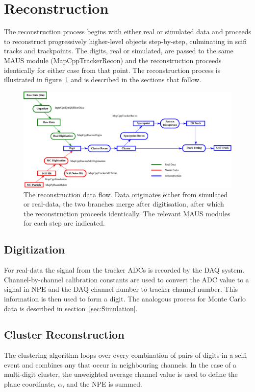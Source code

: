 \section{Reconstruction}
\label{sec:Reconstruction}
The reconstruction process begins with either real or simulated data and proceeds to reconstruct progressively higher-level objects step-by-step, culminating in scifi tracks and trackpoints. The digits, real or simulated, are passed to the same MAUS module (MapCppTrackerRecon) and the reconstruction proceeds identically for either case from that point. The reconstruction process is illustrated in figure~\ref{fig:DataFlow} and is described in the sections that follow.

\begin{figure}[tb]
  \begin{center}
    \includegraphics[width=0.95\linewidth]{07-Reconstruction/DataFlow2014.pdf}
    \caption{\label{fig:DataFlow} The reconstruction data flow. Data originates either from simulated or real-data, the two branches merge after digitisation, after which the reconstruction proceeds identically.  The relevant MAUS modules for each step are indicated.}
  \end{center}
\end{figure}

  \subsection{Digitization}
  \label{subsec:Digitization}
  For real-data the signal from the tracker ADCs is recorded by the DAQ system.  Channel-by-channel calibration constants are used to convert the ADC value to a signal in NPE and the DAQ channel number to tracker channel number.  This information is then used to form a digit.  The analogous process for Monte Carlo data is described in section~\ref{sec:Simulation}.

  \subsection{Cluster Reconstruction}
  \label{subsec:Clustering}
  The clustering algorithm loops over every combination of pairs of digits in a scifi event and combines any that occur in neighbouring channels. In the case of a multi-digit cluster, the unweighted average channel value is used to define the plane coordinate, $\alpha$, and the NPE is summed.

